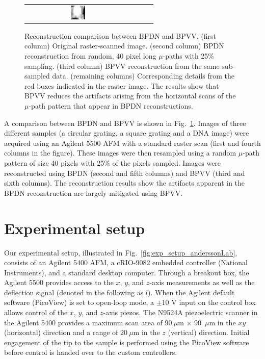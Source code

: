 \documentclass[twocolumn,twoside]{IEEEtran/IEEEtran}
\begin{document}
\begin{figure}[htbp]
\begin{tabular}{cccccc}
                                                                                                                                                       & \includegraphics[width=0.16\textwidth]{figures-SBA/dnaforbptv_bptv_40mu_zoomin}		
  \end{tabular}
  \caption{Reconstruction comparison between BPDN and BPVV. (first column)
    Original raster-scanned image. (second column) BPDN reconstruction from
    random, 40 pixel long $\mu$-paths with 25\% sampling. (third column) BPVV
    reconstruction from the same sub-sampled data. (remaining columns)
    Corresponding details from the red boxes indicated in the raster image. The
    results show that BPVV reduces the artifacts arising from the horizontal
    scans of the $\mu$-path pattern that appear in BPDN reconstructions.}
  \label{fig:BPTV_demonstration}
\end{figure}
\endgroup
		
A comparison between BPDN and BPVV is shown in
Fig.~\ref{fig:BPTV_demonstration}. Images of three different samples (a circular
grating, a square grating and a DNA image) were acquired using an Agilent 5500
AFM with a standard raster scan (first and fourth columns in the figure). These
images were then resampled using a random $\mu$-path pattern of size 40 pixels
with 25\% of the pixels sampled. Images were reconstructed using BPDN (second
and fifth columns) and BPVV (third and sixth columns). The reconstruction
results show the artifacts apparent in the BPDN reconstruction are largely
mitigated using BPVV.
	

\section{Experimental setup} \label{sec:experimentalSetup}
Our experimental setup, illustrated in Fig.~\ref{fig:exp_setup_anderssonLab},
consists of an Agilent 5400 AFM, a cRIO-9082 embedded controller (National
Instruments), and a standard desktop computer. Through a breakout box, the
Agilent 5500 provides access to the $x$, $y$, and $z$-axis measurements as well
as the deflection signal (denoted in the following as $l$). When the Agilent
default software (PicoView) is set to open-loop mode, a $\pm 10$ V input on the
control box allows control of the $x$, $y$, and $z$-axis piezos. The N9524A
piezoelectric scanner in the Agilent 5400 provides a maximum scan area of
$90~\mu$m $\times$ 90~$\mu$m in the $xy$ (horizontal) direction and a range of
$20~\mu$m in the $z$ (vertical) direction. Initial engagement of the tip to the
sample is performed using the PicoView software before control is handed over to
the custom controllers.
\end{document}
